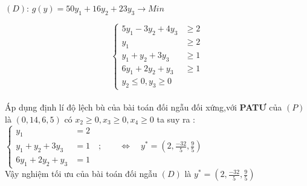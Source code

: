 \documentclass{article}
\begin{document}
\begin{center}
$\left(D\right)$: $g(y)=50y_1+16y_2+23y_3 \longrightarrow  Min$\\
\end{center}
\[\left\{\begin{aligned}
5y_1-3y_2+4y_3&\geq2 \\
y_1&\geq2 \\
y_1+y_2+3y_3&\geq1 \\
6y_1+2y_2+y_3&\geq1 \\
y_2\leq 0,y_3\geq 0
\end{aligned}\right.\]\\
Áp dụng định lí độ lệch bù của bài toán đối ngẫu đối xứng,với \textbf{PATƯ} của $\left(P\right)$ là $\left(0,14,6,5\right)$ có $x_2\geq 0,x_3\geq 0,x_4\geq 0$ ta suy ra :$\left\{\begin{aligned} 
y_1&=2 \\
y_1+y_2+3y_3&=1\quad;\qquad  \Longleftrightarrow \quad y^*=\left(2,\frac{-32}{5},\frac{9}{5}\right)\\
6y_1+2y_2+y_3&=1 
\end{aligned}\right.$\\
Vậy nghiệm tối ưu của bài toán đối ngẫu $\left(D\right)$ là $y^*=\left(2,\frac{-32}{5},\frac{9}{5}\right)$





           
\end{document}

